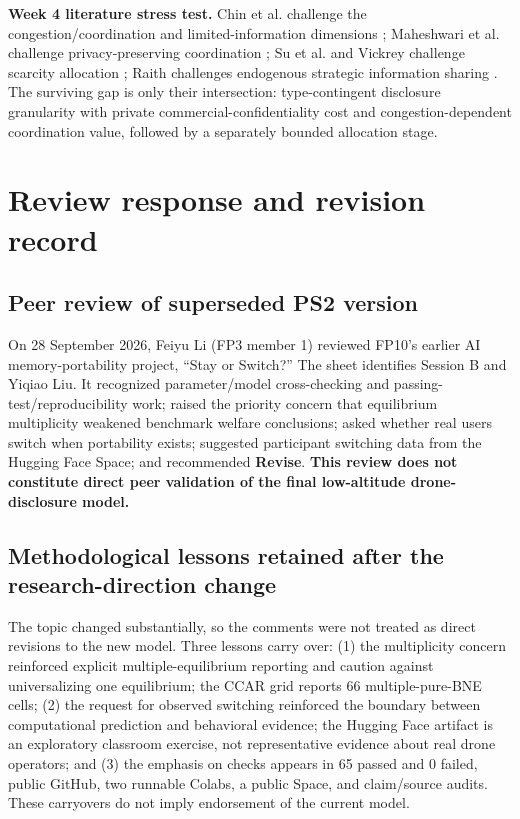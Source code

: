 \noindent\textbf{Week 4 literature stress test.} Chin et al. challenge the congestion/coordination and limited-information dimensions \cite{chin2022efficient,chin2023traffic}; Maheshwari et al. challenge privacy-preserving coordination \cite{maheshwari2025privacy}; Su et al. and Vickrey challenge scarcity allocation \cite{su2024vertiport,vickrey1961counterspeculation}; Raith challenges endogenous strategic information sharing \cite{raith1996general}. The surviving gap is only their intersection: type-contingent disclosure granularity with private commercial-confidentiality cost and congestion-dependent coordination value, followed by a separately bounded allocation stage.


\section{Review response and revision record}
\begingroup\footnotesize
\subsection{Peer review of superseded PS2 version}
On 28 September 2026, Feiyu Li (FP3 member 1) reviewed FP10's earlier AI memory-portability project, ``Stay or Switch?'' The sheet identifies Session B and Yiqiao Liu. It recognized parameter/model cross-checking and passing-test/reproducibility work; raised the priority concern that equilibrium multiplicity weakened benchmark welfare conclusions; asked whether real users switch when portability exists; suggested participant switching data from the Hugging Face Space; and recommended \textbf{Revise}. \textbf{This review does not constitute direct peer validation of the final low-altitude drone-disclosure model.}

\subsection{Methodological lessons retained after the research-direction change}
The topic changed substantially, so the comments were not treated as direct revisions to the new model. Three lessons carry over: (1) the multiplicity concern reinforced explicit multiple-equilibrium reporting and caution against universalizing one equilibrium; the CCAR grid reports 66 multiple-pure-BNE cells; (2) the request for observed switching reinforced the boundary between computational prediction and behavioral evidence; the Hugging Face artifact is an exploratory classroom exercise, not representative evidence about real drone operators; and (3) the emphasis on checks appears in 65 passed and 0 failed, public GitHub, two runnable Colabs, a public Space, and claim/source audits. These carryovers do not imply endorsement of the current model.

